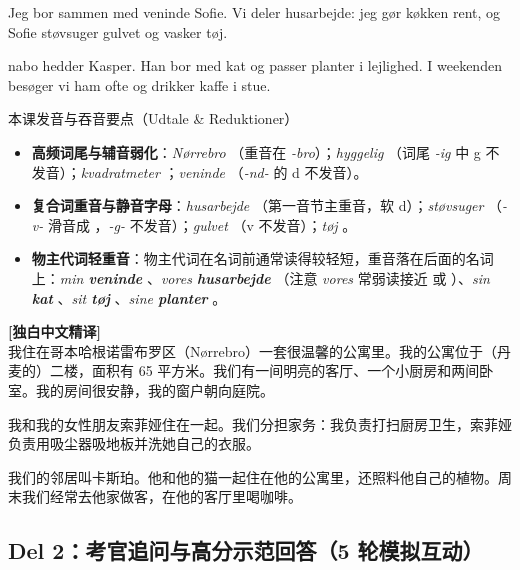 Jeg bor sammen med  veninde Sofie. Vi deler  husarbejde: jeg gør  køkken rent, og Sofie støvsuger gulvet og vasker  tøj.

 nabo hedder Kasper. Han bor med  kat og passer  planter i  lejlighed. I weekenden besøger vi ham ofte og drikker kaffe i  stue.

\begin{tipbox}{本课发音与吞音要点（Udtale \& Reduktioner）}
\begin{itemize}
  \item \textbf{高频词尾与辅音弱化}：\textit{Nørrebro} （重音在 \textit{-bro}）；\textit{hyggelig} （词尾 \textit{-ig} 中 g 不发音）；\textit{kvadratmeter} ；\textit{veninde} （\textit{-nd-} 的 d 不发音）。
  \item \textbf{复合词重音与静音字母}：\textit{husarbejde} （第一音节主重音，软 d）；\textit{støvsuger} （\textit{-v-} 滑音成 ，\textit{-g-} 不发音）；\textit{gulvet} （v 不发音）；\textit{tøj} 。
  \item \textbf{物主代词轻重音}：物主代词在名词前通常读得较轻短，重音落在后面的名词上：\textit{min \textbf{veninde}} 、\textit{vores \textbf{husarbejde}} （注意 \textit{vores} 常弱读接近  或 ）、\textit{sin \textbf{kat}} 、\textit{sit \textbf{tøj}} 、\textit{sine \textbf{planter}} 。
\end{itemize}
\end{tipbox}

\begin{transbox}
\small
\textbf{\color{NCDTeal}[独白中文精译]}\\
我住在哥本哈根诺雷布罗区（Nørrebro）一套很温馨的公寓里。我的公寓位于（丹麦的）二楼，面积有 65 平方米。我们有一间明亮的客厅、一个小厨房和两间卧室。我的房间很安静，我的窗户朝向庭院。

我和我的女性朋友索菲娅住在一起。我们分担家务：我负责打扫厨房卫生，索菲娅负责用吸尘器吸地板并洗她自己的衣服。

我们的邻居叫卡斯珀。他和他的猫一起住在他的公寓里，还照料他自己的植物。周末我们经常去他家做客，在他的客厅里喝咖啡。
\end{transbox}

\subsection*{Del 2：考官追问与高分示范回答（5 轮模拟互动）}

